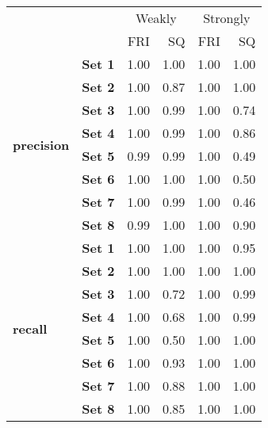 \begin{tabular}{llrrrr}
\toprule
       &      & \multicolumn{2}{c}{Weakly} & \multicolumn{2}{c}{Strongly} \\
       &      &    FRI &   SQ &      FRI &   SQ \\
\midrule
\multirow{8}{*}{\textbf{precision}} & \textbf{Set 1} &   1.00 & 1.00 &     1.00 & 1.00 \\
       & \textbf{Set 2} &   1.00 & 0.87 &     1.00 & 1.00 \\
       & \textbf{Set 3} &   1.00 & 0.99 &     1.00 & 0.74 \\
       & \textbf{Set 4} &   1.00 & 0.99 &     1.00 & 0.86 \\
       & \textbf{Set 5} &   0.99 & 0.99 &     1.00 & 0.49 \\
       & \textbf{Set 6} &   1.00 & 1.00 &     1.00 & 0.50 \\
       & \textbf{Set 7} &   1.00 & 0.99 &     1.00 & 0.46 \\
       & \textbf{Set 8} &   0.99 & 1.00 &     1.00 & 0.90 \\
\cline{1-6}
\multirow{8}{*}{\textbf{recall}} & \textbf{Set 1} &   1.00 & 1.00 &     1.00 & 0.95 \\
       & \textbf{Set 2} &   1.00 & 1.00 &     1.00 & 1.00 \\
       & \textbf{Set 3} &   1.00 & 0.72 &     1.00 & 0.99 \\
       & \textbf{Set 4} &   1.00 & 0.68 &     1.00 & 0.99 \\
       & \textbf{Set 5} &   1.00 & 0.50 &     1.00 & 1.00 \\
       & \textbf{Set 6} &   1.00 & 0.93 &     1.00 & 1.00 \\
       & \textbf{Set 7} &   1.00 & 0.88 &     1.00 & 1.00 \\
       & \textbf{Set 8} &   1.00 & 0.85 &     1.00 & 1.00 \\
\bottomrule
\end{tabular}
